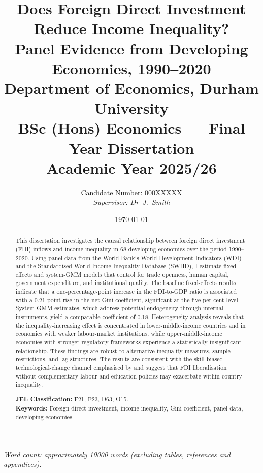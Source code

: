 \documentclass[12pt,a4paper]{article}
\title{%
  \vspace{-1.5cm}
  \textbf{Does Foreign Direct Investment Reduce Income Inequality?\\[6pt]
  Panel Evidence from Developing Economies, 1990--2020}\\[18pt]
  \large Department of Economics, Durham University\\[4pt]
  \large BSc (Hons) Economics --- Final Year Dissertation\\[4pt]
  \large Academic Year 2025/26
}
\author{Candidate Number: 000XXXXX\\[2pt]\textit{Supervisor: Dr~J.~Smith}}
\date{\today}
\begin{document}
\maketitle
\thispagestyle{empty}

\vfill
\begin{center}
\textit{Word count: approximately \num{10000} words (excluding tables, references and appendices).}
\end{center}
\newpage

\begin{abstract}
\noindent
This dissertation investigates the causal relationship between foreign direct investment (FDI) inflows and income inequality in 68 developing economies over the period 1990--2020.  Using panel data from the World Bank's World Development Indicators (WDI) and the Standardised World Income Inequality Database (SWIID), I estimate fixed-effects and system-GMM models that control for trade openness, human capital, government expenditure, and institutional quality.  The baseline fixed-effects results indicate that a one-percentage-point increase in the FDI-to-GDP ratio is associated with a 0.21-point rise in the net Gini coefficient, significant at the five per cent level.  System-GMM estimates, which address potential endogeneity through internal instruments, yield a comparable coefficient of 0.18.  Heterogeneity analysis reveals that the inequality-increasing effect is concentrated in lower-middle-income countries and in economies with weaker labour-market institutions, while upper-middle-income economies with stronger regulatory frameworks experience a statistically insignificant relationship.  These findings are robust to alternative inequality measures, sample restrictions, and lag structures.  The results are consistent with the skill-biased technological-change channel emphasised by \citet{Figini2011} and suggest that FDI liberalisation without complementary labour and education policies may exacerbate within-country inequality.

\medskip
\noindent\textbf{JEL Classification:} F21, F23, D63, O15.\\
\noindent\textbf{Keywords:} Foreign direct investment, income inequality, Gini coefficient, panel data, developing economies.
\end{abstract}
\newpage

\tableofcontents
\newpage
\end{document}
